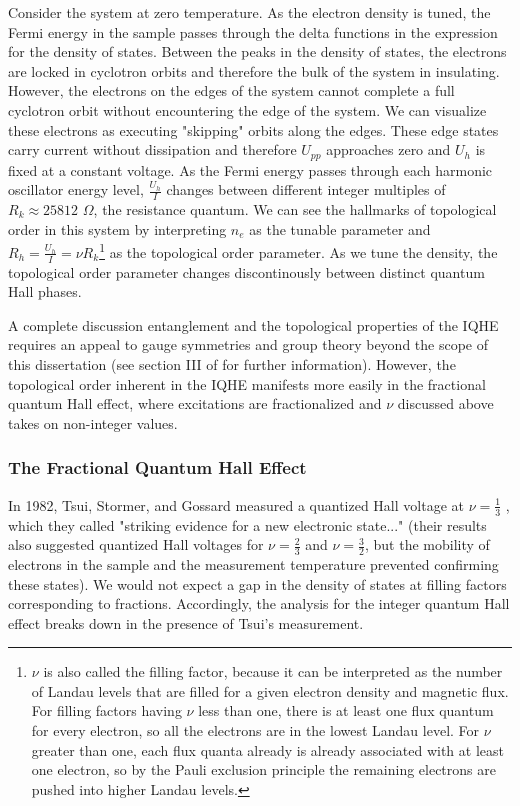Consider the system at zero temperature. As the electron density is tuned, the Fermi energy in the sample passes through the delta functions in the expression for the density of states. Between the peaks in the density of states, the electrons are locked in cyclotron orbits and therefore the bulk of the system in insulating. However, the electrons on the edges of the system cannot complete a full cyclotron orbit without encountering the edge of the system. We can visualize these electrons as executing "skipping" orbits along the edges. These edge states carry current without dissipation and therefore $U_{pp}$ approaches zero and $U_{h}$ is fixed at a constant voltage. As the Fermi energy passes through each harmonic oscillator energy level, $\frac{U_{h}}{I}$ changes between different integer multiples of $R_{k} \approx 25812$ $\Omega$, the resistance quantum. We can see the hallmarks of topological order in this system by interpreting $n_{e}$ as the tunable parameter and $R_{h} = \frac{U_{h}}{I} = \nu R_{k}$\footnote{$\nu$ is also called the filling factor, because it can be interpreted as the number of Landau levels that are filled for a given electron density and magnetic flux. For filling factors having $\nu$ less than one, there is at least one flux quantum for every electron, so all the electrons are in the lowest Landau level. For $\nu$ greater than one, each flux quanta already is already associated with at least one electron, so by the Pauli exclusion principle the remaining electrons are pushed into higher Landau levels.} as the topological order parameter. As we tune the density, the topological order parameter changes discontinously between distinct quantum Hall phases.

A complete discussion entanglement and the topological properties of the IQHE requires an appeal to gauge symmetries and group theory beyond the scope of this dissertation (see section III of \cite{Wen2017} for further information). However, the topological order inherent in the IQHE manifests more easily in the fractional quantum Hall effect, where excitations are fractionalized and $\nu$ discussed above takes on non-integer values.

\subsubsection{The Fractional Quantum Hall Effect}

In 1982, Tsui, Stormer, and Gossard measured a quantized Hall voltage at $\nu = \frac{1}{3}$ \cite{Tsui1982}, which they called "striking evidence for a new electronic state..." (their results also suggested quantized Hall voltages for $\nu = \frac{2}{3}$ and $\nu = \frac{3}{2}$, but the mobility of electrons in the sample and the measurement temperature prevented confirming these states). We would not expect a gap in the density of states at filling factors corresponding to fractions. Accordingly, the analysis for the integer quantum Hall effect breaks down in the presence of Tsui's measurement.

